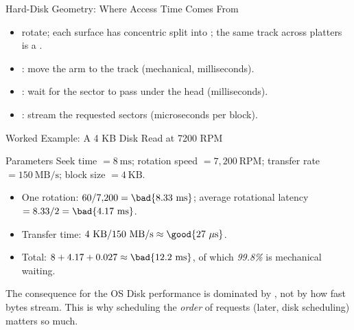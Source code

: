\documentclass[aspectratio=169]{beamer}
\begin{document}
\begin{frame}{Hard-Disk Geometry: Where Access Time Comes From}
  \centering
  \vspace{0.15cm}
  \begin{itemize}
    \item {} rotate; each surface has concentric  split
      into ; the same track across platters is a .
    \item {}: move the arm to the track (mechanical, milliseconds).
    \item {}: wait for the sector to pass under the head
      (milliseconds).
    \item {}: stream the requested sectors (microseconds per block).
  \end{itemize}
\end{frame}

\begin{frame}{Worked Example: A 4 KB Disk Read at 7200 RPM}
  \begin{block}{Parameters}
    Seek time $= 8\ \text{ms}$; rotation speed $= 7{,}200\ \text{RPM}$;
    transfer rate $= 150\ \text{MB/s}$; block size $= 4\ \text{KB}$.
  \end{block}
  \begin{itemize}
    \item One rotation: $60/7{,}200 = \bad{8.33\ \text{ms}}$; average rotational
      latency $= 8.33/2 = \bad{4.17\ \text{ms}}$.
    \item Transfer time: $4\ \text{KB} / 150\ \text{MB/s} \approx
      \good{27\ \mu\text{s}}$.
    \item Total: $8 + 4.17 + 0.027 \approx \bad{12.2\ \text{ms}}$, of which
      \emph{99.8\%} is mechanical waiting.
  \end{itemize}
  \vspace{0.15cm}
  \begin{alertblock}{The consequence for the OS}
    Disk performance is dominated by , not by how fast
    bytes stream. This is why scheduling the \emph{order} of requests (later,
    disk scheduling) matters so much.
  \end{alertblock}
\end{frame}
\end{document}
